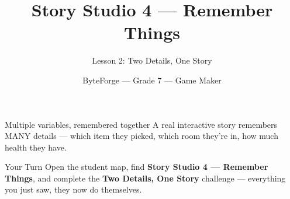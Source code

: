 \documentclass[aspectratio=169]{beamer}
\title{Story Studio 4 — Remember Things}
\subtitle{Lesson 2: Two Details, One Story}
\author{ByteForge --- Grade 7 --- Game Maker}
\date{}
\begin{document}
\begin{frame}
    \titlepage
\end{frame}

\begin{frame}{Multiple variables, remembered together}
    \Large
    A real interactive story remembers MANY details — which item they picked, which room they're in, how much health they have.
\end{frame}

\begin{frame}{Your Turn}
    \Large
    Open the student map, find \textbf{Story Studio 4 — Remember Things}, and complete
    the \textbf{Two Details, One Story} challenge --- everything you just saw, they now do themselves.
\end{frame}
\end{document}
